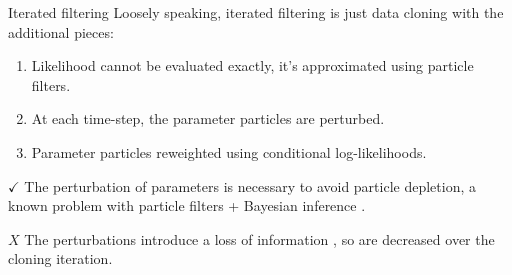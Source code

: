 \documentclass[aspectratio=169]{beamer}\usepackage[]{graphicx}\usepackage[]{xcolor}
\begin{document}
\begin{frame}{Iterated filtering}
  Loosely speaking, iterated filtering is just data cloning with the additional pieces: 
  \begin{enumerate}
    \item Likelihood cannot be evaluated exactly, it's approximated using particle filters. 
    \item At each time-step, the parameter particles are perturbed.
    \item Parameter particles reweighted using conditional log-likelihoods.
  \end{enumerate}\pause
  {\color{green} $\checkmark$} The perturbation of parameters is necessary to avoid particle depletion, a known problem with particle filters + Bayesian inference \citep{chen24}.
  
  {\color{red} $X$} The perturbations introduce a loss of information \citep{liu01}, so are decreased over the cloning iteration.
\end{frame}
\end{document}
